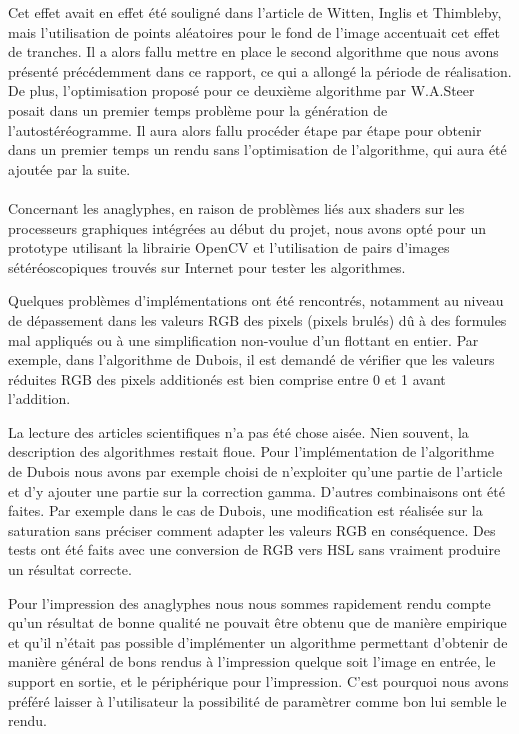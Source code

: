 Cet effet avait en effet été souligné dans l'article de Witten, Inglis et Thimbleby, mais l'utilisation de points aléatoires pour le fond de l'image accentuait cet effet de tranches. 
Il a alors fallu mettre en place le second algorithme que nous avons présenté précédemment dans ce rapport, ce qui a allongé la période de réalisation. De plus, l'optimisation proposé pour ce deuxième algorithme par W.A.Steer posait dans un premier temps problème pour la génération de l'autostéréogramme. Il aura alors fallu procéder étape par étape pour obtenir dans un premier temps un rendu sans l'optimisation de l'algorithme, qui aura été ajoutée par la suite.

\paragraph{}
Concernant les anaglyphes, en raison de problèmes liés aux shaders sur les processeurs graphiques intégrées au début du projet, nous avons opté pour un prototype utilisant la librairie OpenCV et l'utilisation de pairs d'images sétéréoscopiques trouvés sur Internet pour tester les algorithmes.

Quelques problèmes d'implémentations ont été rencontrés, notamment au niveau de dépassement dans les valeurs RGB des pixels (pixels brulés) dû à des formules mal appliqués ou à une simplification non-voulue d'un flottant en entier. Par exemple, dans l'algorithme de Dubois, il est demandé de vérifier que les valeurs réduites RGB des pixels additionés est bien comprise entre 0 et 1 avant l'addition.

La lecture des articles scientifiques n'a pas été chose aisée. Nien souvent, la description des algorithmes restait floue. Pour l'implémentation de l'algorithme de Dubois nous avons par exemple choisi de n'exploiter qu'une partie de l'article et d'y ajouter une partie sur la correction gamma. D'autres combinaisons ont été faites. Par exemple dans le cas de Dubois, une modification est réalisée sur la saturation sans préciser comment adapter les valeurs RGB en conséquence. Des tests ont été faits avec une conversion de RGB vers HSL sans vraiment produire un résultat correcte.

Pour l'impression des anaglyphes nous nous sommes rapidement rendu compte qu'un résultat de bonne qualité ne pouvait être obtenu que de manière empirique et qu'il n'était pas possible d'implémenter un algorithme permettant d'obtenir de manière général de bons rendus à l'impression quelque soit l'image en entrée, le support en sortie, et le périphérique pour l'impression. C'est pourquoi nous avons préféré laisser à l'utilisateur la possibilité de paramètrer comme bon lui semble le rendu.

